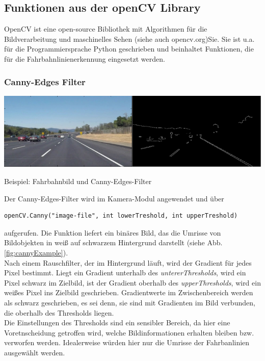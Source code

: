\subsection{Funktionen aus der openCV Library}
OpenCV ist eine open-source Bibliothek mit Algorithmen für die 
  Bildverarbeitung und maschinelles Sehen (siehe auch opencv.org)Sie. Sie ist u.a. für die
Programmiersprache Python geschrieben und beinhaltet Funktionen, die für die
Fahrbahnlinienerkennung eingesetzt werden.\\
\subsubsection{Canny-Edges Filter}

\begin{minipage}{\columnwidth}
  \makeatletter
  \def\@captype{figure}
  \makeatother
  \centering
  \includegraphics[width = 0.8\linewidth]{images/cannyEdgesExample.png}
  \caption{Beispiel: Fahrbahnbild und Canny-Edges-Filter}
  \label{fig:cannyExample}
\end{minipage}{
\vspace{0.8cm}
  
Der Canny-Edges-Filter wird im Kamera-Modul angewendet und über
\begin{lstlisting}
openCV.Canny("image-file", int lowerTreshold, int upperTreshold)
\end{lstlisting}
aufgerufen. Die Funktion liefert ein binäres Bild, das die Umrisse
  von Bildobjekten in weiß auf schwarzem Hintergrund darstellt
(siehe Abb.\ref{fig:cannyExample}).\\
Nach einem Rauschfilter, der im Hintergrund läuft, wird der Gradient
für jedes Pixel bestimmt. Liegt ein Gradient unterhalb des
\textit{untererThresholds},
wird ein Pixel schwarz im Zielbild, ist der Gradient oberhalb des
\textit{upperThresholds}, wird ein weißes Pixel ins Zielbild geschrieben. 
Gradientwerte im Zwischenbereich werden als schwarz geschrieben, es sei denn, 
sie sind mit Gradienten im Bild verbunden, die oberhalb des Thresholds liegen.\\
Die Einstellungen des Thresholds sind ein sensibler Bereich, da hier eine
Voretnscheidung getroffen wird, welche Bildinformationen erhalten bleiben bzw.
verworfen werden. Idealerweise würden hier nur die Umrisse der Fahrbanlinien
ausgewählt werden.\\

}

